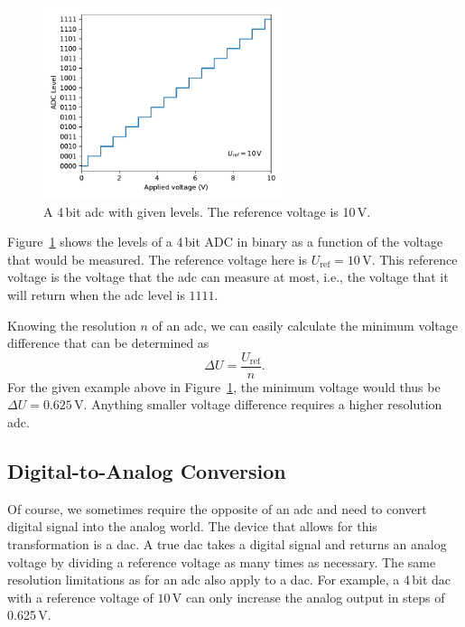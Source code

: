 \begin{figure}[tb]
    \centering
    \includegraphics[width=0.625\textwidth]{graphics/00_introduction/adc.pdf}
    \caption{A 4\,bit \ac{adc} with given levels. The reference voltage is 10\,V.}
    \label{fig:intro:adc}
\end{figure}
Figure~\ref{fig:intro:adc} shows the levels of a 4\,bit ADC in binary as a function of the voltage that would be measured. The reference voltage here is $U_\mathrm{ref} = 10\,$V. This reference voltage is the voltage that the \ac{adc} can measure at most, i.e., the voltage that it will return when the \ac{adc} level is $1111$. 

Knowing the resolution $n$ of an \ac{adc}, we can easily calculate the minimum voltage difference that can be determined as 
\begin{equation}
    \Delta U = \frac{U_\mathrm{ref}}{n}.
\end{equation}
For the given example above in Figure~\ref{fig:intro:adc}, the minimum voltage would thus be $\Delta U  = 0.625\,$V. Anything smaller voltage difference requires a higher resolution \ac{adc}.


\subsection{Digital-to-Analog Conversion}\label{sec:intro:dac}

Of course, we sometimes require the opposite of an \ac{adc} and need to convert digital signal into the analog world. The device that allows for this transformation is a \ac{dac}. A true \ac{dac} takes a digital signal and returns an analog voltage by dividing a reference voltage as many times as necessary. The same resolution limitations as for an \ac{adc} also apply to a \ac{dac}. For example, a 4\,bit \ac{dac} with a reference voltage of $10\,$V can only increase the analog output in steps of 0.625\,V.

